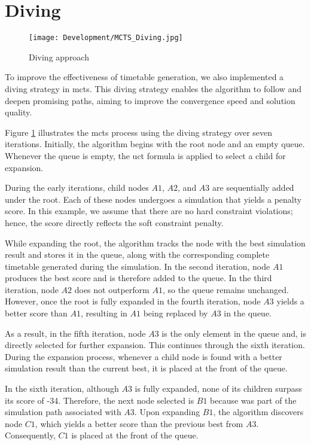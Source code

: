 \section{Diving}\label{sec:diving}

\begin{figure}
      \centering
      \texttt{[image: Development/MCTS\_Diving.jpg]}
      \caption[Diving approach]
      {Diving approach}
      \label{fig:diving}
\end{figure}

To improve the effectiveness of timetable generation, we also implemented a diving strategy in \ac{mcts}. This diving strategy enables the algorithm to follow and deepen promising paths, aiming to improve the convergence speed and solution quality.

Figure \ref{fig:diving} illustrates the \ac{mcts} process using the diving strategy over seven iterations. Initially, the algorithm begins with the root node and an empty queue. Whenever the queue is empty, the \ac{uct} formula is applied to select a child for expansion.

During the early iterations, child nodes \(A1\), \(A2\), and \(A3\) are sequentially added under the root. Each of these nodes undergoes a simulation that yields a penalty score. In this example, we assume that there are no hard constraint violations; hence, the score directly reflects the soft constraint penalty. 

While expanding the root, the algorithm tracks the node with the best simulation result and stores it in the queue, along with the corresponding complete timetable generated during the simulation. In the second iteration, node \(A1\) produces the best score and is therefore added to the queue. In the third iteration, node \(A2\) does not outperform \(A1\), so the queue remains unchanged. However, once the root is fully expanded in the fourth iteration, node \(A3\) yields a better score than \(A1\), resulting in \(A1\) being replaced by \(A3\) in the queue. 

As a result, in the fifth iteration, node \(A3\) is the only element in the queue and, is directly selected for further expansion. This continues through the sixth iteration. During the expansion process, whenever a child node is found with a better simulation result than the current best, it is placed at the front of the queue. 

In the sixth iteration, although \(A3\) is fully expanded, none of its children surpass its score of -34. Therefore, the next node selected is \(B1\) because was part of the simulation path associated with \(A3\). Upon expanding \(B1\), the algorithm discovers node \(C1\), which yields a better score than the previous best from \(A3\). Consequently, \(C1\) is placed at the front of the queue.  

